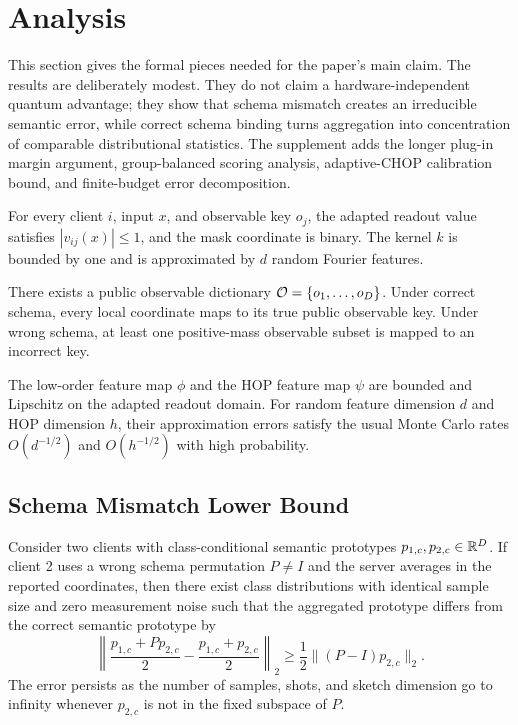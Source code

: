 \section{Analysis}

This section gives the formal pieces needed for the paper's main claim. The results are deliberately modest. They do not claim a hardware-independent quantum advantage; they show that schema mismatch creates an irreducible semantic error, while correct schema binding turns aggregation into concentration of comparable distributional statistics. The supplement adds the longer plug-in margin argument, group-balanced scoring analysis, adaptive-CHOP calibration bound, and finite-budget error decomposition.

\begin{assumption}
For every client \(i\), input \(x\), and observable key \(o_j\), the adapted readout value satisfies \(|v_{ij}(x)|\le 1\), and the mask coordinate is binary. The kernel \(k\) is bounded by one and is approximated by \(d\) random Fourier features.
\end{assumption}

\begin{assumption}
There exists a public observable dictionary \(\mathcal{O}=\{o_1,\ldots,o_D\}\). Under correct schema, every local coordinate maps to its true public observable key. Under wrong schema, at least one positive-mass observable subset is mapped to an incorrect key.
\end{assumption}

\begin{assumption}
The low-order feature map \(\phi\) and the HOP feature map \(\psi\) are bounded and Lipschitz on the adapted readout domain. For random feature dimension \(d\) and HOP dimension \(h\), their approximation errors satisfy the usual Monte Carlo rates \(O(d^{-1/2})\) and \(O(h^{-1/2})\) with high probability.
\end{assumption}

\subsection{Schema Mismatch Lower Bound}

\begin{theorem}
Consider two clients with class-conditional semantic prototypes \(p_{1,c},p_{2,c}\in\mathbb{R}^D\). If client 2 uses a wrong schema permutation \(P\neq I\) and the server averages in the reported coordinates, then there exist class distributions with identical sample size and zero measurement noise such that the aggregated prototype differs from the correct semantic prototype by
\begin{equation}
    \left\|
    \frac{p_{1,c}+Pp_{2,c}}{2}
    -
    \frac{p_{1,c}+p_{2,c}}{2}
    \right\|_2
    \ge
    \frac{1}{2}\|(P-I)p_{2,c}\|_2.
\end{equation}
The error persists as the number of samples, shots, and sketch dimension go to infinity whenever \(p_{2,c}\) is not in the fixed subspace of \(P\).
\end{theorem}


